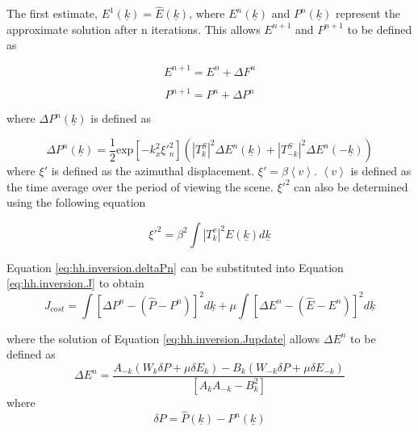 The first estimate, $E^1(\underline{k}) = \hat{E}(\underline{k})$, where $E^n(\underline{k})$ and $P^n(\underline{k})$ represent the approximate solution after n iterations. This allows $E^{n+1}$ and $P^{n+1}$ to be defined as

\begin{equation} \label{eq:hh.inversion.Fn+1}
    E^{n+1} = E^n + \Delta F^n
\end{equation}

\begin{equation} \label{eq:hh.inversion.Pn+1}
    P^{n+1} = P^n + \Delta P^n
\end{equation}

where $\Delta P^n(\underline{k})$  is defined as

\begin{equation} \label{eq:hh.inversion.deltaPn}
    \Delta P^n(\underline{k}) = \frac{1}{2} \text{exp} \left [ -k^2_x {\xi}'^2_n \right ] \left ( \left | T^S_k \right |^2 \Delta E^n(\underline{k}) + \left | T^S_{-k} \right |^2 \Delta E^n(-\underline{k}) \right )
\end{equation}
where $\xi'$ is defined as the azimuthal displacement. $\xi' = \beta \left \langle v \right \rangle$. $\left \langle v \right \rangle$ is defined as the time average over the period of viewing the scene. $\xi'^2$ can also be determined using the following equation \cite{Hasselmann1991,Wadhams2002}

\begin{equation} \label{eq:hh.inversion.xi}
    \xi'^{2} = \beta ^{2} \int \left | T^{v}_k \right | ^2 E(\underline{k}) d\underline{k}
\end{equation}

Equation \ref{eq:hh.inversion.deltaPn} can be substituted into Equation \ref{eq:hh.inversion.J} to obtain
\begin{equation} \label{eq:hh.inversion.Jupdate}
    J_{cost} = \int \left [ \Delta P^n - \left ( \hat{P} - P^n \right ) \right ]^2 d\underline{k} + \mu \int \left [ \Delta E^n - \left ( \hat{E} - E^n \right )  \right ]^2 d\underline{k}
\end{equation}

where the solution of Equation \ref{eq:hh.inversion.Jupdate} allows $\Delta E^n$ to be defined as \cite{Hasselmann1991}
\begin{equation}
    \Delta E^n = \frac{A_{-k}(W_k \delta P + \mu \delta E_k) - B_k(W_{-k} \delta P + \mu\delta E_{-k})}{\left [ A_kA_{-k} - B^2_k  \right ]}
\end{equation}
where
\begin{equation} \label{eq:hh.inversion.deltaP}
    \delta P = \hat{P}(\underline{k}) - P^n(\underline{k})
\end{equation}

